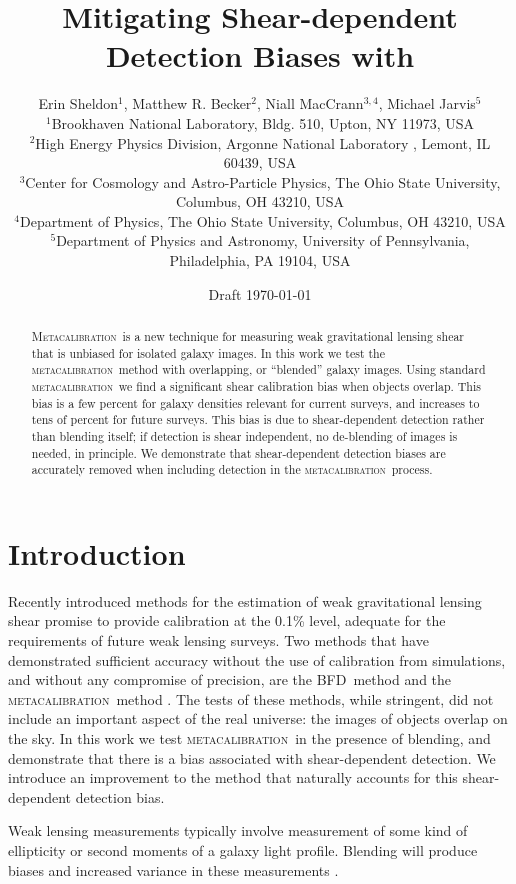 \documentclass[fleqn,useAMS,usenatbib]{mnras}
\title[Metadetection]{Mitigating Shear-dependent Detection Biases with \Mcal}
\author[Sheldon et~al.]{Erin Sheldon$^1$, Matthew R. Becker$^2$,
Niall MacCrann$^{3,4}$, Michael Jarvis$^5$
  \\$^1$Brookhaven National Laboratory, Bldg. 510, Upton, NY 11973, USA
  \\$^2$High Energy Physics Division, Argonne National Laboratory , Lemont, IL 60439, USA
  \\$^3$Center for Cosmology and Astro-Particle Physics, The Ohio State University, Columbus, OH 43210, USA
  \\$^4$Department of Physics, The Ohio State University, Columbus, OH 43210, USA
  \\$^5$Department of Physics and Astronomy, University of Pennsylvania, Philadelphia, PA 19104, USA
}
\newcommand{\mcal}{\textsc{metacalibration}}
\newcommand{\Mcal}{\textsc{Metacalibration}}
\newcommand{\bfd}{\textsc{BFD}}
\begin{document}
\date{Draft \today}
\maketitle

\begin{abstract}

\Mcal\ is a new technique for measuring weak gravitational lensing shear that
is unbiased for isolated galaxy images.  In this work we test the \mcal\ method
with overlapping, or ``blended'' galaxy images.  Using standard \mcal\ we find
a significant shear calibration bias when objects overlap. This bias is a few
percent for galaxy densities relevant for current surveys, and increases to
tens of percent for future surveys.  This bias is due to shear-dependent
detection rather than blending itself; if detection is shear independent, no
de-blending of images is needed, in principle.  We demonstrate that
shear-dependent detection biases are accurately removed when including
detection in the \mcal\ process.

\end{abstract}

\section{Introduction}


Recently introduced methods for the estimation of weak gravitational lensing
shear promise to provide calibration at the 0.1\% level, adequate for the
requirements of future weak lensing surveys.  Two methods that have
demonstrated sufficient accuracy without the use of calibration from
simulations, and without any compromise of precision, are the \bfd\ method
\citep{BernBFD2016} and the \mcal\ method \citep{HuffMcal2017,SheldonMcal2017}.
The tests of these methods, while stringent, did not include an important
aspect of the real universe: the images of objects overlap on the sky. In this
work we test \mcal\ in the presence of blending, and demonstrate that there is
a bias associated with shear-dependent detection.  We introduce an improvement
to the method that naturally accounts for this shear-dependent detection bias.


Weak lensing measurements typically involve measurement of some kind of
ellipticity or second moments of a galaxy light profile.  Blending will produce
biases and increased variance in these measurements \citep{DawsonBlending2016}.
\end{document}
